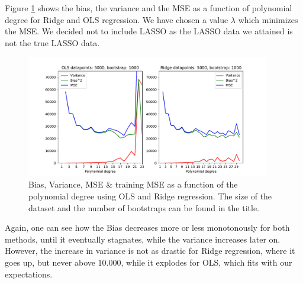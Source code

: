 \documentclass[11pt,a4paper,titlepage]{article}
\begin{document}
Figure \ref{fig:biasVariance_Korea} shows the bias, the variance and the MSE as a function of polynomial degree for Ridge and OLS regression. We have chosen a value $\lambda$ which minimizes the MSE. We decided not to include LASSO as the LASSO data we attained is not the true LASSO data.
\begin{figure}[H]
\centering
\includegraphics[width=0.95\textwidth]{figures/presentable_data/Bias_variance_Korea.pdf}
\caption[Bias, Variance, MSE \& training MSE as a function of the polynomial degree for geodata]{Bias, Variance, MSE \& training MSE as a function of the polynomial degree using OLS and Ridge regression. The size of the dataset and the number of bootstraps can be found in the title.}
\label{fig:biasVariance_Korea}
\end{figure}
 Again, one can see how the Bias decreases more or less monotonously for both methods, until it eventually stagnates, while the variance increases later on. However, the increase in variance is not as drastic for Ridge regression, where it goes up, but never above 10.000, while it explodes for OLS, which fits with our expectations. 
\end{document}
